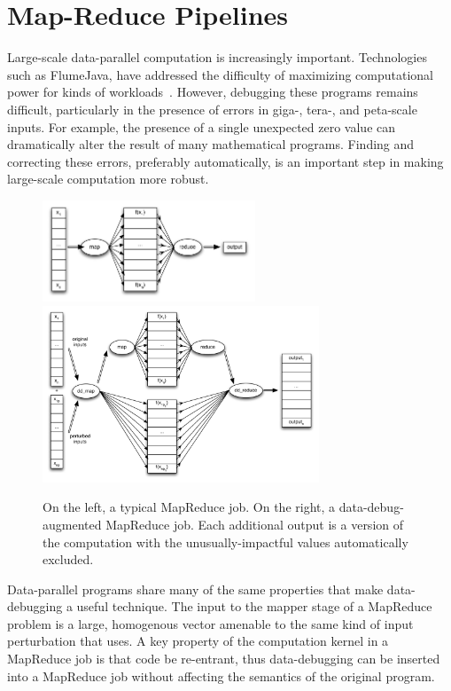 \section{Map-Reduce Pipelines}
Large-scale data-parallel computation is increasingly important.  Technologies such as FlumeJava, have addressed the difficulty of maximizing computational power for kinds of workloads~\cite{pldi:flumejava}.  However, debugging these programs remains difficult, particularly in the presence of errors in giga-, tera-, and peta-scale inputs.  For example, the presence of a single unexpected zero value can dramatically alter the result of many mathematical programs.  Finding and correcting these errors, preferably automatically, is an important step in making large-scale computation more robust.

\begin{figure}[t]
	\includegraphics[width=2.5in]{images/mapreduce}
  \hfill
	\includegraphics[width=3.25in]{images/mapreduce_dd}
	\caption{
		On the left, a typical MapReduce job.  On the right, a data-debug-augmented MapReduce job.  Each additional output is a version of the computation with the unusually-impactful values automatically excluded.\label{fig:mapreduce_pipeline}
	}
\end{figure}

Data-parallel programs share many of the same properties that make data-debugging a useful technique.  The input to the mapper stage of a MapReduce problem is a large, homogenous vector amenable to the same kind of input perturbation that \checkcell{} uses.  A key property of the computation kernel in a MapReduce job is that code be re-entrant, thus data-debugging can be inserted into a MapReduce job without affecting the semantics of the original program.


